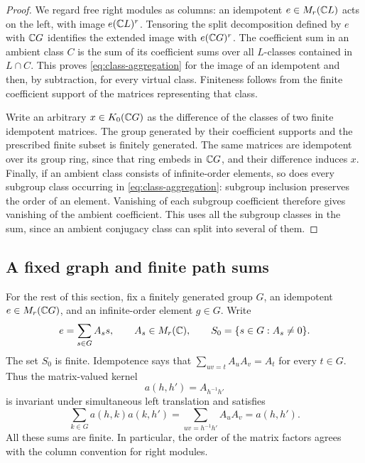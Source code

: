 \begin{proof}
We regard free right modules as columns: an idempotent
$e\in M_r(\mathbb C L)$ acts on the left, with image $e(\mathbb C L)^r$.
Tensoring the split decomposition defined by $e$ with $\mathbb C G$ identifies
the extended image with $e(\mathbb C G)^r$.  The coefficient sum in an ambient
class $C$ is the sum of its coefficient sums over all $L$-classes contained
in $L\cap C$.  This proves \eqref{eq:class-aggregation} for the image of an
idempotent and then, by subtraction, for every virtual class.  Finiteness
follows from the finite coefficient support of the matrices representing
that class.

Write an arbitrary $x\in K_0(\mathbb C G)$ as the difference of the classes of
two finite idempotent matrices.  The group generated by their coefficient
supports and the prescribed finite subset is finitely generated.  The
same matrices are idempotent over its group ring, since that ring embeds
in $\mathbb C G$, and their difference induces $x$.  Finally, if an ambient class
consists of infinite-order elements, so does every subgroup class occurring
in \eqref{eq:class-aggregation}: subgroup inclusion preserves the order of
an element.  Vanishing of each subgroup coefficient therefore gives
vanishing of the ambient coefficient.  This uses all the subgroup classes
in the sum, since an ambient conjugacy class can split into several of
them.
\end{proof}

\subsection{A fixed graph and finite path sums}

For the rest of this section, fix a finitely generated group $G$, an
idempotent $e\in M_r(\mathbb C G)$, and an infinite-order element $g\in G$.
Write
\[
 e=\sum_{s\in G}A_s s,\qquad A_s\in M_r(\mathbb C),\qquad
 S_0=\{s\in G:A_s\ne0\}.
\]
The set $S_0$ is finite.  Idempotence says that
$\sum_{uv=t}A_uA_v=A_t$ for every $t\in G$.  Thus the matrix-valued kernel
\[
 a(h,h')=A_{h^{-1}h'}
\]
is invariant under simultaneous left translation and satisfies
\begin{equation}\label{eq:kernel-idempotence}
 \sum_{k\in G}a(h,k)a(k,h')
 =\sum_{uv=h^{-1}h'}A_uA_v
 =a(h,h').
\end{equation}
All these sums are finite.  In particular, the order of the matrix
factors agrees with the column convention for right modules.

